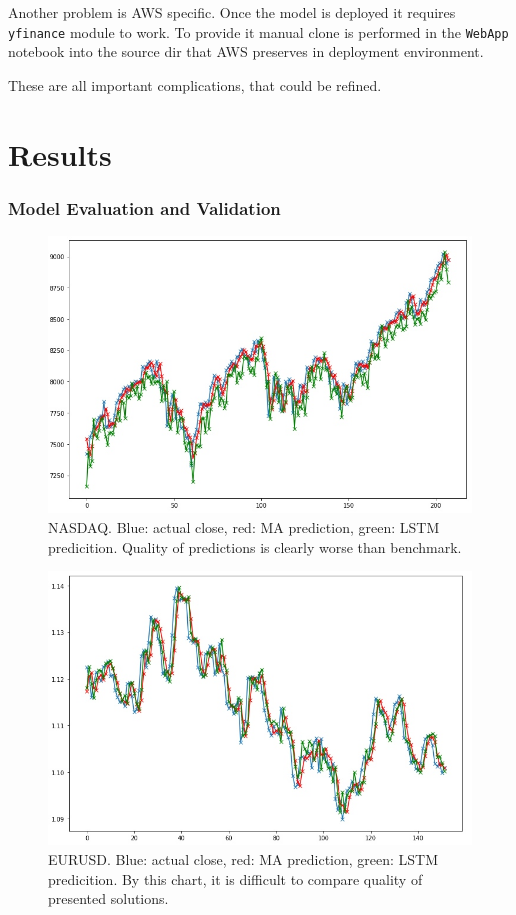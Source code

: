 \documentclass[a4paper,12pt]{article}
\begin{document}
Another problem is AWS specific. Once the model is deployed it requires \texttt{yfinance} module to work.
To provide it manual clone is performed in the \texttt{WebApp} notebook into the source dir that AWS preserves in deployment environment.

These are all important complications, that could be refined.


\part{Results}
\section{Model Evaluation and Validation}
\begin{figure}[h]
	\label{vsnasdaq}
	\centering
	\includegraphics[scale=2.5]{nasdaqVs}
	\caption{NASDAQ. Blue: actual close, red: MA prediction, green: LSTM predicition. Quality of predictions is clearly worse than benchmark.}
\end{figure}

\begin{figure}[h]
	\label{vseurusd}
	\centering
	\includegraphics[scale=2.5]{eurusdVs}
	\caption{EURUSD. Blue: actual close, red: MA prediction, green: LSTM predicition. By this chart, it is difficult to compare quality of presented solutions.}
\end{figure}
\end{document}
